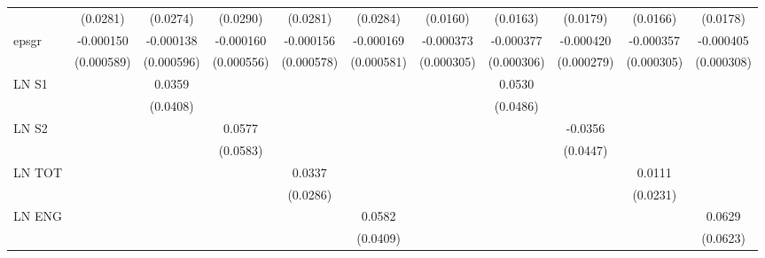 \begin{table}[htbp]
\begin{tabular}{l*{10}{c}}
                & (0.0281)         & (0.0274)         & (0.0290)         & (0.0281)         & (0.0284)         & (0.0160)         & (0.0163)         & (0.0179)         & (0.0166)         & (0.0178)         \\
epsgr           &-0.000150         &-0.000138         &-0.000160         &-0.000156         &-0.000169         &-0.000373         &-0.000377         &-0.000420         &-0.000357         &-0.000405         \\
                &(0.000589)         &(0.000596)         &(0.000556)         &(0.000578)         &(0.000581)         &(0.000305)         &(0.000306)         &(0.000279)         &(0.000305)         &(0.000308)         \\
LN S1           &                  &   0.0359         &                  &                  &                  &                  &   0.0530         &                  &                  &                  \\
                &                  & (0.0408)         &                  &                  &                  &                  & (0.0486)         &                  &                  &                  \\
LN S2           &                  &                  &   0.0577         &                  &                  &                  &                  &  -0.0356         &                  &                  \\
                &                  &                  & (0.0583)         &                  &                  &                  &                  & (0.0447)         &                  &                  \\
LN TOT          &                  &                  &                  &   0.0337         &                  &                  &                  &                  &   0.0111         &                  \\
                &                  &                  &                  & (0.0286)         &                  &                  &                  &                  & (0.0231)         &                  \\
LN ENG          &                  &                  &                  &                  &   0.0582         &                  &                  &                  &                  &   0.0629         \\
                &                  &                  &                  &                  & (0.0409)         &                  &                  &                  &                  & (0.0623)         \\

\end{tabular}
\end{table}
